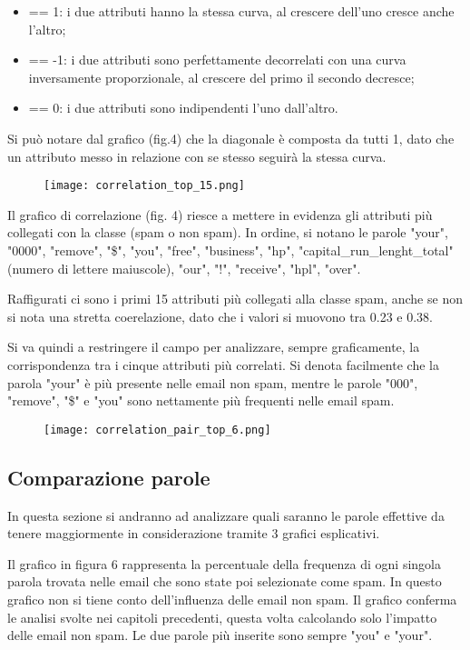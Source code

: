 \documentclass[12pt,a4paper]{article}
\begin{document}
\begin{itemize}
\item == 1: i due attributi hanno la stessa curva, al crescere dell'uno cresce anche l'altro;
\item == -1: i due attributi sono perfettamente decorrelati con una curva inversamente proporzionale, al crescere del primo il secondo decresce;
\item == 0: i due attributi sono indipendenti l'uno dall'altro.
\end{itemize}
 Si può notare dal grafico (fig.4) che la diagonale è composta da tutti 1, dato che un attributo messo in relazione con se stesso seguirà la stessa curva.

\begin{figure}[h]
    \texttt{[image: correlation\_top\_15.png]}
    \caption{}
\end{figure}

Il grafico di correlazione (fig. 4) riesce a mettere in evidenza gli attributi più collegati con la classe (spam o non spam). In ordine, si notano le parole "your", "0000", "remove", "\$", "you", "free", "business", "hp", "capital\_run\_lenght\_total" (numero di lettere maiuscole), "our", "!", "receive", "hpl", "over".

Raffigurati ci sono i primi 15 attributi più collegati alla classe spam, anche se non si nota una stretta coerelazione, dato che i valori si muovono tra 0.23 e 0.38.

Si va quindi a restringere il campo per analizzare, sempre graficamente, la corrispondenza tra i cinque attributi più correlati. Si denota facilmente che la parola "your" è più presente nelle email non spam, mentre le parole "000", "remove", "\$" e "you" sono nettamente più frequenti nelle email spam.

\begin{figure}[h]
    \texttt{[image: correlation\_pair\_top\_6.png]}
    \caption{}
\end{figure}

\subsection{Comparazione parole}
In questa sezione si andranno ad analizzare quali saranno le parole effettive da tenere maggiormente in considerazione tramite 3 grafici esplicativi.


Il grafico in figura 6 rappresenta la percentuale della frequenza di ogni singola parola trovata nelle email che sono state poi selezionate come spam. In questo grafico non si tiene conto dell'influenza delle email non spam. Il grafico conferma le analisi svolte nei capitoli precedenti, questa volta calcolando solo l'impatto delle email non spam. Le due parole più inserite sono sempre "you" e "your".
\end{document}
